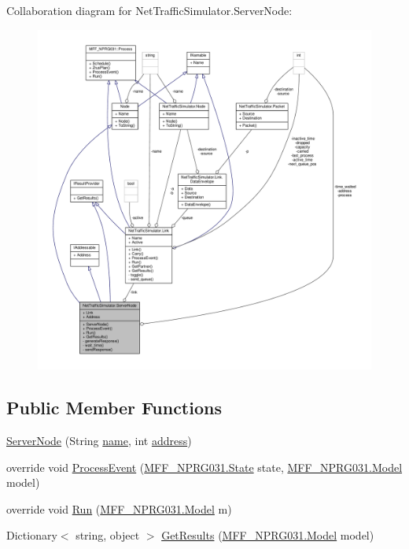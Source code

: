 Collaboration diagram for Net\-Traffic\-Simulator.\-Server\-Node\-:
\nopagebreak
\begin{figure}[H]
\begin{center}
\leavevmode
\includegraphics[width=350pt]{classNetTrafficSimulator_1_1ServerNode__coll__graph}
\end{center}
\end{figure}
\subsection*{Public Member Functions}
\begin{DoxyCompactItemize}
\item 
\hyperlink{classNetTrafficSimulator_1_1ServerNode_a0773c3d7230848f02282f217fcead9c3}{Server\-Node} (String \hyperlink{classNetTrafficSimulator_1_1Node_a679d5b6cca77c0cdb46cc98c347d4747}{name}, int \hyperlink{classNetTrafficSimulator_1_1ServerNode_a8be317d1e315710190755e4560fea3ef}{address})
\item 
override void \hyperlink{classNetTrafficSimulator_1_1ServerNode_ab309ebda509474d7a7f14b60955e5f98}{Process\-Event} (\hyperlink{classMFF__NPRG031_1_1State}{M\-F\-F\-\_\-\-N\-P\-R\-G031.\-State} state, \hyperlink{classMFF__NPRG031_1_1Model}{M\-F\-F\-\_\-\-N\-P\-R\-G031.\-Model} model)
\item 
override void \hyperlink{classNetTrafficSimulator_1_1ServerNode_aec78a48eea4006df1b4bce59ef17fbf7}{Run} (\hyperlink{classMFF__NPRG031_1_1Model}{M\-F\-F\-\_\-\-N\-P\-R\-G031.\-Model} m)
\item 
Dictionary$<$ string, object $>$ \hyperlink{classNetTrafficSimulator_1_1ServerNode_ab361087ec7201d5b8bdef1154d1315ef}{Get\-Results} (\hyperlink{classMFF__NPRG031_1_1Model}{M\-F\-F\-\_\-\-N\-P\-R\-G031.\-Model} model)
\end{DoxyCompactItemize}
